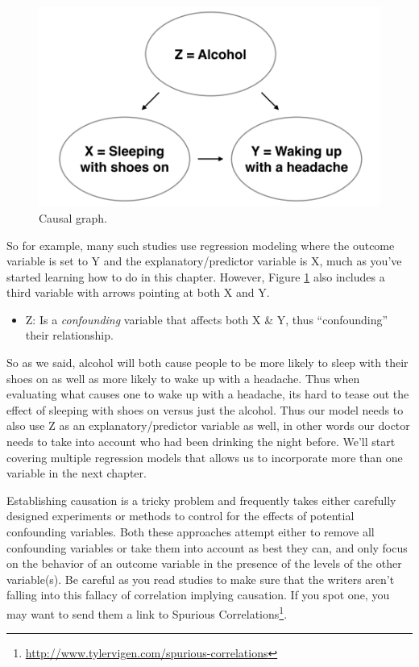 \documentclass[12pt, krantz2,]{krantz}
\providecommand{\tightlist}{%
  \setlength{\itemsep}{0pt}\setlength{\parskip}{0pt}}
\renewcommand{\href}[2]{#2\footnote{\url{#1}}}
\begin{document}
\begin{figure}

{\centering \includegraphics[width=\textwidth]{images/flowcharts/flowchart.009-cropped} 

}

\caption{Causal graph.}\label{fig:moderndive-figure-causal-graph}
\end{figure}

So for example, many such studies use regression modeling where the outcome variable is set to Y and the explanatory/predictor variable is X, much as you've started learning how to do in this chapter. However, Figure \ref{fig:moderndive-figure-causal-graph} also includes a third variable with arrows pointing at both X and Y.

\begin{itemize}
\tightlist
\item
  Z: Is a \emph{confounding} variable that affects both X \& Y, thus ``confounding'' their relationship.
\end{itemize}

So as we said, alcohol will both cause people to be more likely to sleep with their shoes on as well as more likely to wake up with a headache. Thus when evaluating what causes one to wake up with a headache, its hard to tease out the effect of sleeping with shoes on versus just the alcohol. Thus our model needs to also use Z as an explanatory/predictor variable as well, in other words our doctor needs to take into account who had been drinking the night before. We'll start covering multiple regression models that allows us to incorporate more than one variable in the next chapter.

Establishing causation is a tricky problem and frequently takes either carefully designed experiments or methods to control for the effects of potential confounding variables. Both these approaches attempt either to remove all confounding variables or take them into account as best they can, and only focus on the behavior of an outcome variable in the presence of the levels of the other variable(s). Be careful as you read studies to make sure that the writers aren't falling into this fallacy of correlation implying causation. If you spot one, you may want to send them a link to \href{http://www.tylervigen.com/spurious-correlations}{Spurious Correlations}.
\end{document}

